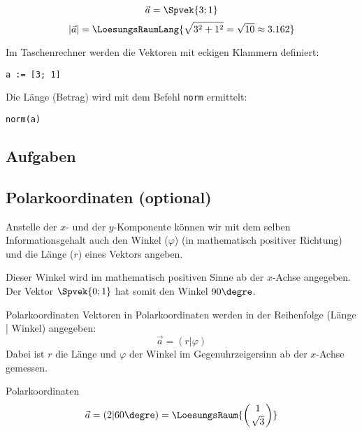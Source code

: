     \begin{beispiel}{}{}
      $$ \vec{a}= \Spvek{3;1}$$
        $$|\vec{a}| = \LoesungsRaumLang{\sqrt{3^2+1^2} = \sqrt{10}\approx 3.162}$$
      \end{beispiel}
    

    \begin{bemerkung}{}{}
      Im Taschenrechner werden die Vektoren mit eckigen Klammern
      definiert:

      \texttt{a := [3; 1]}

      Die Länge (Betrag) wird mit dem Befehl \texttt{norm} ermittelt:

      \texttt{norm(a)}
    \end{bemerkung}
    \subsection*{Aufgaben}
\newpage

\subsection{Polarkoordinaten (optional)}


\newpage

Anstelle der $x$- und der $y$-Komponente können wir mit dem selben
Informationsgehalt auch den Winkel ($\varphi$)
(in mathematisch positiver Richtung) und die Länge ($r$) eines Vektors
angeben.


Dieser Winkel wird im mathematisch positiven Sinne ab der $x$-Achse
angegeben. Der Vektor
$\Spvek{0;1}$ hat somit den Winkel $90\degre$.
  \begin{definition}{Polarkoordinaten}{}
    Vektoren in Polarkoordinaten werden in der Reihenfolge (Länge |
    Winkel) angegeben:
    $$\vec{a} = (r | \varphi)$$
    Dabei ist $r$ die Länge und $\varphi$ der Winkel im
    Gegenuhrzeigersinn ab der $x$-Achse gemessen.
  \end{definition}

  \begin{beispiel}{Polarkoordinaten}{}
    $$\vec{a} = (2 | 60\degre) = \LoesungsRaum{\left(1\atop \sqrt{3}\right)}$$
  \end{beispiel}
  
